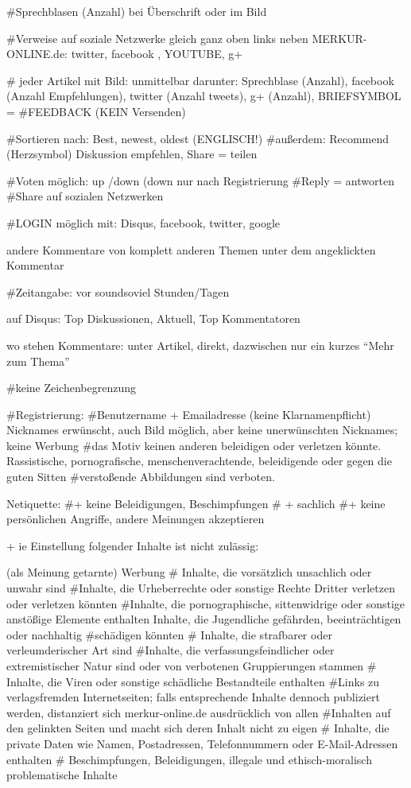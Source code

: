 #Sprechblasen (Anzahl) bei Überschrift oder im Bild

#Verweise auf soziale Netzwerke  gleich ganz oben links neben MERKUR-ONLINE.de: twitter, facebook , YOUTUBE, g+

# jeder Artikel mit Bild: unmittelbar darunter: Sprechblase (Anzahl), facebook (Anzahl Empfehlungen), twitter (Anzahl tweets), g+ (Anzahl), BRIEFSYMBOL =  #FEEDBACK (KEIN Versenden)

#Sortieren nach: Best, newest, oldest (ENGLISCH!)
#außerdem: Recommend (Herzsymbol) Diskussion empfehlen, Share = teilen 

#Voten möglich: up /down (down nur nach Registrierung
#Reply = antworten
#Share auf sozialen Netzwerken

#LOGIN möglich mit: Disqus, facebook, twitter, google

andere Kommentare von komplett anderen Themen unter dem angeklickten Kommentar

#Zeitangabe: vor soundsoviel Stunden/Tagen

auf Disqus: Top Diskussionen, Aktuell, Top Kommentatoren

wo stehen Kommentare: unter Artikel, direkt, dazwischen nur ein kurzes ``Mehr zum Thema''

#keine Zeichenbegrenzung



#Registrierung:
#Benutzername + Emailadresse (keine Klarnamenpflicht) Nicknames erwünscht, auch Bild möglich, aber keine unerwünschten Nicknames; keine Werbung
#das Motiv keinen anderen beleidigen oder verletzen könnte. Rassistische, pornografische, menschenverachtende, beleidigende oder gegen die guten Sitten #verstoßende Abbildungen sind verboten.



Netiquette:
#+ keine Beleidigungen, Beschimpfungen
# + sachlich
#+ keine persönlichen Angriffe, andere Meinungen akzeptieren 

+ ie Einstellung folgender Inhalte ist nicht zulässig:

    (als Meinung getarnte) Werbung
   # Inhalte, die vorsätzlich unsachlich oder unwahr sind
    #Inhalte, die Urheberrechte oder sonstige Rechte Dritter verletzen oder verletzen könnten
    #Inhalte, die pornographische, sittenwidrige oder sonstige anstößige Elemente enthalten Inhalte, die Jugendliche gefährden, beeinträchtigen oder nachhaltig #schädigen könnten
   # Inhalte, die strafbarer oder verleumderischer Art sind
    #Inhalte, die verfassungsfeindlicher oder extremistischer Natur sind oder von verbotenen Gruppierungen stammen
   # Inhalte, die Viren oder sonstige schädliche Bestandteile enthalten
    #Links zu verlagsfremden Internetseiten; falls entsprechende Inhalte dennoch publiziert werden, distanziert sich merkur-online.de ausdrücklich von allen #Inhalten auf den gelinkten Seiten und macht sich deren Inhalt nicht zu eigen
   # Inhalte, die private Daten wie Namen, Postadressen, Telefonnummern oder E-Mail-Adressen enthalten
   # Beschimpfungen, Beleidigungen, illegale und ethisch-moralisch problematische Inhalte
    
